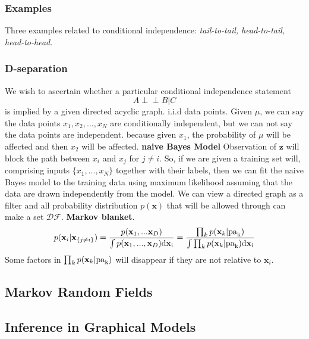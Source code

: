 \documentclass[a4paper]{book}
\def\ci{\perp\!\!\!\perp}
\renewcommand{\bf}{\mathbf}
\begin{document}
\subsubsection{Examples}
Three examples related to conditional independence: \textit{tail-to-tail, head-to-tail, head-to-head}.
\subsubsection{D-separation}
We wish to ascertain whether a particular conditional
independence statement$$A\ci B |C$$is implied by a given directed acyclic graph.
\newline
i.i.d data points. Given $\mu$, we can say the data points $x_1,x_2,...,x_N$ are conditionally independent, but we can not say the data points are independent. because given $x_1$, the probability of $\mu$ will be affected and then $x_2$ will be affected.
\newline
\textbf{naive Bayes Model} Observation of $\bf{z}$ will block the path between $x_i$ and $x_j$ for $j\neq i$. So, if we are given a training set will, comprising inputs $\{x_1,...,x_N\}$ together with their labels, then we can fit the naive Bayes model to the training data using maximum likelihood assuming that the data are drawn independently from the model.
\newline
We can view a directed graph as a filter and all probability distribution $p(\bf x)$ that will be allowed through can make a set $\mathcal {DF}$.
\newline
\textbf{Markov blanket}.
\begin{equation}\label{eq8.9}
  p(\bf{x}_i|\bf{x}_{\{j\neq i\}}) = \frac{p(\bf x_1,...\bf x_D)}{\int p(\bf x_1,...,\bf x_D)\rm d\bf x_i}=\frac{\prod_k p(\bf x_k|\rm{pa}_k)}{\int \prod_k p(\bf x_k|\rm{pa}_k)\rm{d}\bf x_i}
\end{equation}
Some factors in $\prod_k p(\bf x_k|\rm{pa}_k)$ will disappear if they are not relative to $\bf x_i$.
\subsection{Markov Random Fields}

\subsection{Inference in Graphical Models}
\end{document}
